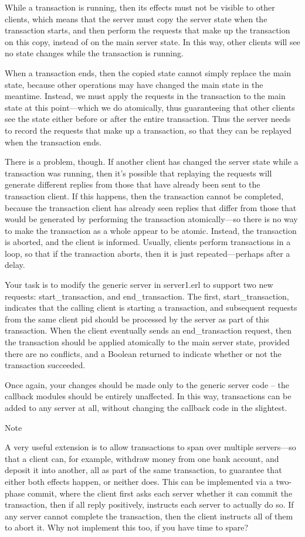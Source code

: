 \documentclass{article}
\begin{document}
While a transaction is running, then its effects must not be visible
to other clients, which means that the server must copy the server
state when the transaction starts, and then perform the requests that
make up the transaction on this copy, instead of on the main server
state. In this way, other clients will see no state changes while the
transaction is running.


When a transaction ends, then the copied state cannot simply replace
the main state, because other operations may have changed the main
state in the meantime. Instead, we must apply the requests in the
transaction to the main state at this point—which we do atomically,
thus guaranteeing that other clients see the state either before or
after the entire transaction.  Thus the server needs to record the
requests that make up a transaction, so that they can be replayed when
the transaction ends.

There is a problem, though. If another client has changed the server
state while a transaction was running, then it’s possible that
replaying the requests will generate different replies from those that
have already been sent to the transaction client. If this happens,
then the transaction cannot be completed, because the transaction
client has already seen replies that differ from those that would be
generated by performing the transaction atomically—so there is no way
to make the transaction as a whole appear to be atomic. Instead, the
transaction is aborted, and the client is informed. Usually, clients
perform transactions in a loop, so that if the transaction aborts,
then it is just repeated—perhaps after a delay.

Your task is to modify the generic server in \textsf{server1.erl} to support
two new requests: \textsf{start\_transaction}, and
\textsf{end\_transaction}. The first, \textsf{start\_transaction},
indicates that the calling client is starting a transaction, and
subsequent requests from the same client pid should be processed by
the server as part of this transaction. When the client eventually
sends an \textsf{end\_transaction} request, then the transaction
should be applied atomically to the main server state, provided there
are no conflicts, and a Boolean returned to indicate whether or not
the transaction succeeded.

Once again, your changes should be made only to the generic server
code -- the callback modules should be entirely unaffected. In this way,
transactions can be added to any server at all, without changing the
callback code in the slightest.

Note

A very useful extension is to allow transactions to span over multiple
servers—so that a client can, for example, withdraw money from one
bank account, and deposit it into another, all as part of the same
transaction, to guarantee that either both effects happen, or neither
does. This can be implemented via a two-phase commit, where the client
first asks each server whether it can commit the transaction, then if
all reply positively, instructs each server to actually do so. If any
server cannot complete the transaction, then the client instructs all
of them to abort it. Why not implement this too, if you have time to
spare?
\end{document}
